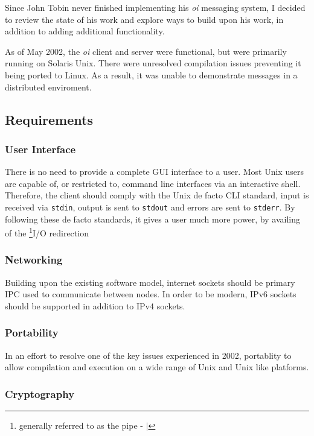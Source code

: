 Since John Tobin never finished implementing his \emph{oi} messaging
system, I decided to review the state of his work and explore ways to
build upon his work, in addition to adding additional functionality.


As of May 2002, the \emph{oi} client and server were functional, but
were primarily running on Solaris Unix. There were unresolved
compilation issues preventing it being ported to Linux. As a result, it
was unable to demonstrate messages in a distributed enviroment.

\subsection{Requirements}

\subsubsection{User Interface}

There is no need to provide a complete GUI interface to a user. Most
Unix users are capable of, or restricted to, command line interfaces via
an interactive shell. Therefore, the client should comply with the 
Unix de facto CLI standard, input is received via \verb!stdin!, output
is sent to \verb!stdout! and errors are sent to \verb!stderr!. By
following these de facto standards, it gives a user much more power, by
availing of the 
\footnote{generally referred to as the pipe - $\mid$}{I/O redirection}

\subsubsection{Networking}

Building upon the existing software model, internet sockets should be 
primary IPC used to communicate between nodes. In order to be modern,
IPv6 sockets should be supported in addition to IPv4 sockets.

\subsubsection{Portability}

In an effort to resolve one of the key issues experienced in 2002, 
portablity to allow compilation and execution on a wide range of Unix
and Unix like platforms.

\subsubsection{Cryptography}

